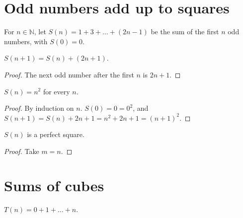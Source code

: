 
\chapter{Odd numbers add up to squares}

\begin{definition}\label{def:oddSum}
  \leanok
  For $n \in \mathbb{N}$, let $S(n) = 1 + 3 + \dots + (2n - 1)$ be the sum of the first $n$ odd
  numbers, with $S(0) = 0$.
\end{definition}

\begin{lemma}\label{lem:oddSum_succ}
  \leanok
  $S(n + 1) = S(n) + (2n + 1)$.
\end{lemma}
\begin{proof}\leanok
  The next odd number after the first $n$ is $2n + 1$.
\end{proof}

\begin{theorem}\label{thm:oddSum_eq_sq}
  \leanok
  $S(n) = n^2$ for every $n$.
\end{theorem}
\begin{proof}\leanok
  By induction on $n$. $S(0) = 0 = 0^2$, and
  $S(n + 1) = S(n) + 2n + 1 = n^2 + 2n + 1 = (n + 1)^2$.
\end{proof}

\begin{corollary}\label{cor:oddSum_isSquare}
  \leanok
  $S(n)$ is a perfect square.
\end{corollary}
\begin{proof}\leanok
  Take $m = n$.
\end{proof}

\chapter{Sums of cubes}

\begin{definition}\label{def:sumTo}
  \leanok
  $T(n) = 0 + 1 + \dots + n$.
\end{definition}

